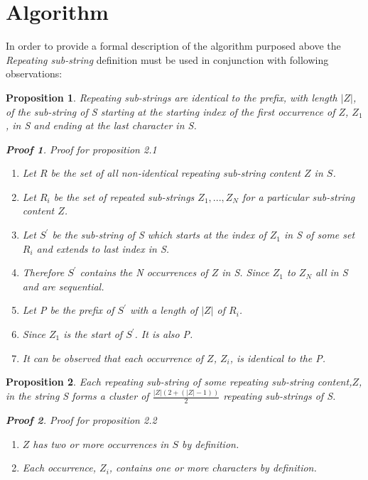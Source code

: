 \documentclass[12pt]{article}
\newtheorem{thm}{Proposition}[section]
\newtheorem{prf}{Proof}[section]
\begin{document}
\section{Algorithm}
\begin{flushleft} 
	In order to provide a formal description of the algorithm purposed above the \textit{Repeating sub-string} definition must be used in conjunction with following observations:
	\begin{thm} 
	Repeating sub-strings are identical to the prefix, with length $|Z|$, of the sub-string of S starting at the starting index of the first occurrence of $Z$, $Z_{1}$, in S and ending at the last character in S. 
		\begin{prf} Proof for proposition 2.1\\		
			\begin{enumerate}		
				\item Let $R$ be the set of all non-identical repeating sub-string content $Z$ in $S$.
				\item Let $R_{i}$ be the set of repeated sub-strings ${Z_{1},...,Z_{N}}$ for a particular sub-string content $Z$.
				\item Let $S^{\prime}$ be the sub-string of S which starts at the index of $Z_{1}$ in S of some set $R_{i}$ and extends to last index in S.
				\item Therefore $S^{\prime}$ contains the N occurrences of $Z$ in S. Since $Z_{1}$ to $Z_{N}$ all in S and are sequential.
				\item Let P be the prefix of $S^{\prime}$ with a length of $|Z|$ of $R_{i}$.		
				\item Since $Z_{1}$ is the start of $S^{\prime}$. It is also P.
				\item It can be observed that each occurrence of $Z$, $Z_{i}$, is identical to the P.
			\end{enumerate}
		\end{prf}
	\end{thm}
	\newpage
	\begin{thm}
	Each repeating sub-string of some repeating sub-string content,$Z$, in the string S forms a cluster of $\frac{|Z|(2 + (|Z|-1))}{2}$ repeating sub-strings of S.
		\begin{prf} Proof for proposition 2.2		
			\begin{enumerate}
				\item $Z$ has two or more occurrences in $S$ by definition.
				\item Each occurrence, $Z_{i}$, contains one or more characters by definition.

\end{enumerate}
\end{prf}
\end{thm}
\end{flushleft}
\end{document}
